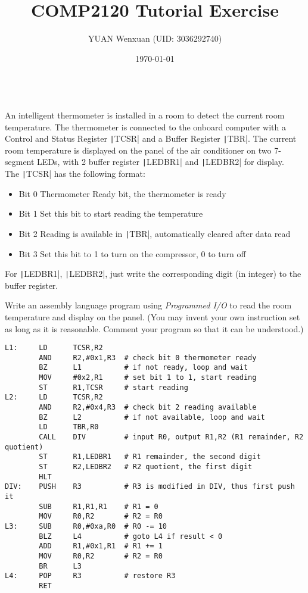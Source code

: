 \documentclass[answers]{exam}
\title{COMP2120 Tutorial Exercise}
\author{YUAN Wenxuan (UID: 3036292740)}
\date{\today}
\begin{document}
\maketitle

\begin{questions}

     \\
    An intelligent thermometer is installed in a room to detect the current room temperature.
    The thermometer is connected to the onboard computer with a Control and Status Register \texttt|TCSR| and a Buffer Register \texttt|TBR|.
    The current room temperature is displayed on the panel of the air conditioner on two 7-segment LEDs, with 2 buffer register \texttt|LEDBR1| and \texttt|LEDBR2| for display.\\
    The \texttt|TCSR| has the following format:
    \begin{itemize}
        \item[] Bit 0   Thermometer Ready bit, the thermometer is ready
        \item[] Bit 1   Set this bit to start reading the temperature
        \item[] Bit 2   Reading is available in \texttt|TBR|, automatically cleared after data read
        \item[] Bit 3   Set this bit to 1 to turn on the compressor, 0 to turn off
    \end{itemize}

    For \texttt|LEDBR1|, \texttt|LEDBR2|, just write the corresponding digit (in integer) to the buffer register.

    Write an assembly language program using \textit{Programmed I/O} to read the room temperature and display on the panel. (You may invent your own instruction set as long as it is reasonable. Comment your program so that it can be understood.)

    \begin{solution}
        \begin{verbatim}
L1:     LD      TCSR,R2
        AND     R2,#0x1,R3  # check bit 0 thermometer ready
        BZ      L1          # if not ready, loop and wait
        MOV     #0x2,R1     # set bit 1 to 1, start reading
        ST      R1,TCSR     # start reading
L2:     LD      TCSR,R2     
        AND     R2,#0x4,R3  # check bit 2 reading available
        BZ      L2          # if not available, loop and wait
        LD      TBR,R0
        CALL    DIV         # input R0, output R1,R2 (R1 remainder, R2 quotient)
        ST      R1,LEDBR1   # R1 remainder, the second digit
        ST      R2,LEDBR2   # R2 quotient, the first digit
        HLT
DIV:    PUSH    R3          # R3 is modified in DIV, thus first push it
        SUB     R1,R1,R1    # R1 = 0
        MOV     R0,R2       # R2 = R0
L3:     SUB     R0,#0xa,R0  # R0 -= 10
        BLZ     L4          # goto L4 if result < 0
        ADD     R1,#0x1,R1  # R1 += 1
        MOV     R0,R2       # R2 = R0
        BR      L3
L4:     POP     R3          # restore R3
        RET
    \end{verbatim}
    \end{solution}


\end{questions}
\end{document}
